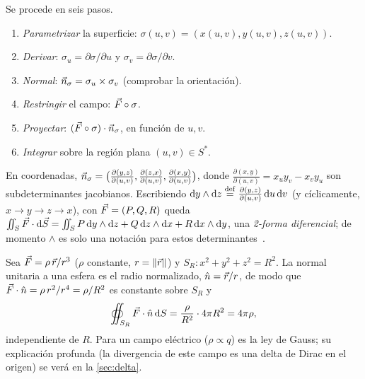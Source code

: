 \begin{notacion}\label{not:procedimiento-flujo}
Se procede en seis pasos.\begin{enumerate}[label=\textbf{\arabic*.}, itemsep=1pt]
  \item \emph{Parametrizar} la superficie: $\sigma(u,v)=(x(u,v),y(u,v),z(u,v))$.
  \item \emph{Derivar}: $\sigma_u=\partial\sigma/\partial u$ y $\sigma_v=\partial\sigma/\partial v$.
  \item \emph{Normal}: $\vec{n}_\sigma=\sigma_u\times\sigma_v$ (comprobar la orientación).
  \item \emph{Restringir} el campo: $\vec{F}\circ\sigma$.
  \item \emph{Proyectar}: $(\vec{F}\circ\sigma)\cdot\vec{n}_\sigma$, en función de $u,v$.
  \item \emph{Integrar} sobre la región plana $(u,v)\in S^{*}$.
\end{enumerate}
\end{notacion}

\begin{observacion}\label{obs:2formas}
En coordenadas, $\vec{n}_\sigma=\bigl(\tfrac{\partial(y,z)}{\partial(u,v)},
\tfrac{\partial(z,x)}{\partial(u,v)},\tfrac{\partial(x,y)}{\partial(u,v)}\bigr)$,
donde $\tfrac{\partial(x,y)}{\partial(u,v)}=x_uy_v-x_vy_u$ son subdeterminantes
jacobianos. Escribiendo $\mathrm{d} y\wedge\mathrm{d} z\mathrel{\overset{\mathrm{def}}{=}}\tfrac{\partial(y,z)}{\partial(u,v)}\,\mathrm{d} u\,\mathrm{d} v$
(y cíclicamente, $x\to y\to z\to x$), con $\vec{F}=(P,Q,R)$ queda
$\iint_S\vec{F}\cdot\mathrm{d}\vec{S}=\iint_SP\,\mathrm{d} y\wedge\mathrm{d} z+Q\,\mathrm{d} z\wedge\mathrm{d} x+R\,\mathrm{d} x\wedge\mathrm{d} y$,
una \emph{2-forma diferencial}; de momento $\wedge$ es solo una notación para
estos determinantes~\cite{NAVAS}.
\end{observacion}

\begin{ejemplo}\label{ej:flujo-r3}
Sea $\vec{F}=\rho\,\vec{r}/r^{3}$ ($\rho$ constante, $r=\lVert \vec{r}\rVert$) y
$S_R:x^{2}+y^{2}+z^{2}=R^{2}$. La normal unitaria a una esfera es el radio
normalizado, $\hat{n}=\vec{r}/r$, de modo que $\vec{F}\cdot\hat{n}=\rho\,r^{2}/r^{4}=\rho/R^{2}$
es constante sobre $S_R$ y
\[
  \oiint_{S_R}\vec{F}\cdot\hat{n}\,\mathrm{d} S=\frac{\rho}{R^{2}}\cdot4\pi R^{2}=4\pi\rho ,
\]
independiente de $R$. Para un campo eléctrico ($\rho\propto q$) es la ley de
Gauss; su explicación profunda (la divergencia de este campo es una delta de
Dirac en el origen) se verá en la \cref{sec:delta}.
\end{ejemplo}

